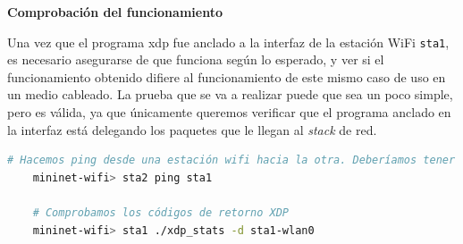 \vspace{0.5cm}
\textbf{Comprobación del funcionamiento}\\
\par

Una vez que el programa \gls{xdp} fue anclado a la interfaz de la estación WiFi \texttt{sta1}, es necesario asegurarse de que funciona según lo esperado, y ver si el funcionamiento obtenido difiere al funcionamiento de este mismo caso de uso en un medio cableado.  La prueba que se va a realizar puede que sea un poco simple, pero es válida, ya que únicamente queremos verificar que el programa anclado en la interfaz está delegando los paquetes que le llegan al \textit{stack} de red.\\
\par



\begin{lstlisting}[language= bash, style=Consola, caption={Comprobación del funcionamiento - Case02},label=code:case02_xdp_wifi_func1]
    # Hacemos ping desde una estación wifi hacia la otra. Deberíamos tener conectividad.
    mininet-wifi> sta2 ping sta1
    
    # Comprobamos los códigos de retorno XDP
    mininet-wifi> sta1 ./xdp_stats -d sta1-wlan0
\end{lstlisting}


